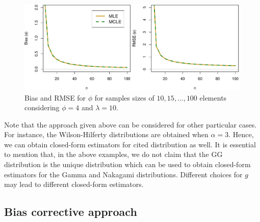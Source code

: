 \documentclass[10pt,a4paper,onecolumn]{article} %
\begin{document}
\begin{figure}[!ht]
\centering
\includegraphics[scale=0.6]{biasnakagami.pdf}	
\caption{Bias and RMSE for $\phi$ for samples sizes of $10,15,\ldots,100$ elements considering $\phi=4$ and $\lambda=10$.}\label{fg2}
\end{figure}	

Note that the approach given above can be considered for other particular cases. For instance, the Wilson-Hilferty distributions are obtained when $\alpha=3$. Hence, we can obtain closed-form estimators for cited distribution as well. It is essential to mention that, in the above examples, we do not claim that the GG distribution is the unique distribution which can be used to obtain closed-form estimators for the Gamma and Nakagami distributions. Different choices for $g$ may lead to different closed-form estimators.



\subsection{Bias corrective approach}
\end{document}
